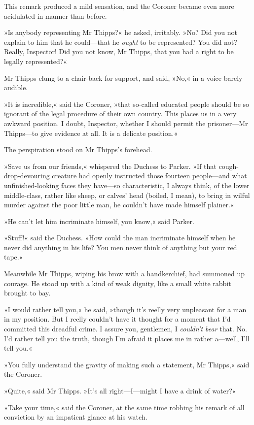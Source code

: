 This remark produced a mild sensation, and the Coroner became even more acidulated in manner than before.

»Is anybody representing Mr Thipps?« he asked, irritably. »No? Did you not explain to him that he could—that he \textit{ought} to be represented? You did not? Really, Inspector! Did you not know, Mr Thipps, that you had a right to be legally represented?«

Mr Thipps clung to a chair-back for support, and said, »No,« in a voice barely audible.

»It is incredible,« said the Coroner, »that so-called educated people should be so ignorant of the legal procedure of their own country. This places us in a very awkward position. I doubt, Inspector, whether I should permit the prisoner—Mr Thipps—to give evidence at all. It is a delicate position.«

The perspiration stood on Mr Thipps's forehead.

»Save us from our friends,« whispered the Duchess to Parker. »If that cough-drop-devouring creature had openly instructed those fourteen people—and what unfinished-looking faces they have—so characteristic, I always think, of the lower middle-class, rather like sheep, or calves' head (boiled, I mean), to bring in wilful murder against the poor little man, he couldn't have made himself plainer.«

»He can't let him incriminate himself, you know,« said Parker.

»Stuff!« said the Duchess. »How could the man incriminate himself when he never did anything in his life? You men never think of anything but your red tape.«

Meanwhile Mr Thipps, wiping his brow with a handkerchief, had summoned up courage. He stood up with a kind of weak dignity, like a small white rabbit brought to bay.

»I would rather tell you,« he said, »though it's reelly very unpleasant for a man in my position. But I reelly couldn't have it thought for a moment that I'd committed this dreadful crime. I assure you, gentlemen, I \textit{couldn't bear} that. No. I'd rather tell you the truth, though I'm afraid it places me in rather a—well, I'll tell you.«

»You fully understand the gravity of making such a statement, Mr Thipps,« said the Coroner.

»Quite,« said Mr Thipps. »It's all right—I—might I have a drink of water?«

»Take your time,« said the Coroner, at the same time robbing his remark of all conviction by an impatient glance at his watch.

